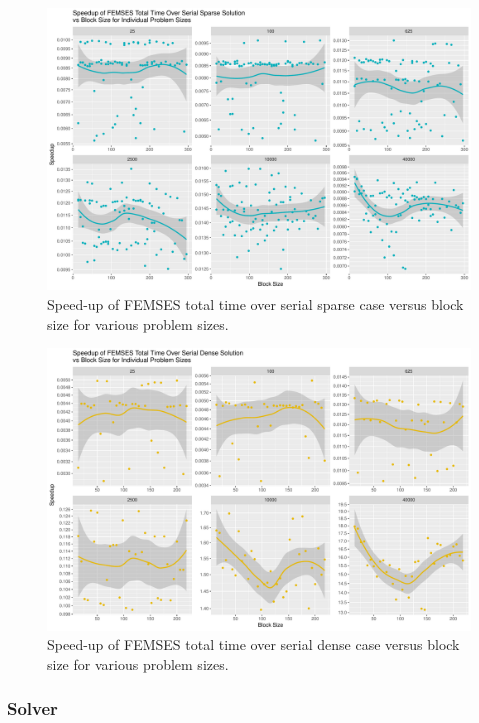 \begin{figure}
	\centering
	\includegraphics[width=0.9\linewidth]{Plots/total_femses_cpu_sparse_speedup_vs_b_facet}
	\caption{Speed-up of FEMSES total time over serial sparse case versus block size for various problem sizes.}
	\label{fig:tot_femses_sparse_b}
\end{figure}
\begin{figure}
	\centering
	\includegraphics[width = 0.9\linewidth]{Plots/total_femses_cpu_dense_speedup_vs_b_facet}
	\caption{Speed-up of FEMSES total time over serial dense case versus block size for various problem sizes.}
	\label{fig:tot_femses_dense_b}
\end{figure}

\subsubsection{Solver}

